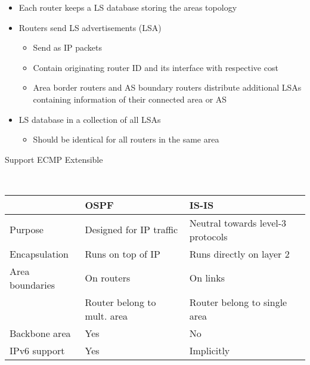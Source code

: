 \begin{itemize}
\begin{itemize}
\begin{itemize}
\begin{itemize}
                            \begin{itemize}
                                \item Each router keeps a LS database storing the areas topology
                                \item Routers send LS advertisements (LSA)
                                    \begin{itemize}
                                        \item Send as IP packets
                                        \item Contain originating router ID and its interface with respective cost
                                        \item Area border routers and AS boundary routers distribute additional LSAs containing information of their connected area or AS
                                    \end{itemize}
                                \item LS database in a collection of all LSAs
                                    \begin{itemize}
                                        \item Should be identical for all routers in the same area
                                    \end{itemize}
                            \end{itemize}
                        \ipro Support ECMP
                        \ipro Extensible
                    \end{itemize}
                \\
\begin{tabular}{| l | l | l |}
    & OSPF & IS-IS\\\hline
    Purpose & Designed for IP traffic & Neutral towards level-3 protocols\\
    Encapsulation & Runs on top of IP & Runs directly on layer 2\\
    Area boundaries & On routers & On links \\
                    & Router belong to mult. area & Router belong to single area\\
    Backbone area & Yes & No\\
    IPv6 support & Yes & Implicitly
\end{tabular}
            \end{itemize}
    \end{itemize}

\end{itemize}
